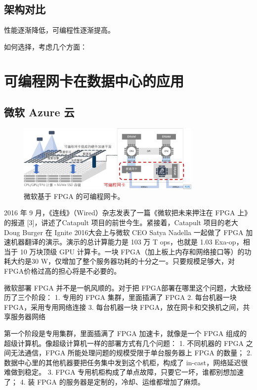 \subsection{架构对比}
\label{smartnic-comparison}

性能逐渐降低，可编程性逐渐提高。

如何选择，考虑几个方面：

\section{可编程网卡在数据中心的应用}

\subsection{微软 Azure 云}

\begin{figure}[htbp]
	\centering
	\includegraphics[width=0.8\textwidth]{figures/azure_fpga.pdf}
	\caption{微软基于 FPGA 的可编程网卡。}
	\label{background:fig:azure_fpga}
\end{figure}


2016 年 9 月，《连线》（Wired）杂志发表了一篇《微软把未来押注在 FPGA 上》的报道 [3]，讲述了Catapult 项目的前世今生。紧接着，Catapult 项目的老大 Doug Burger 在 Ignite 2016大会上与微软 CEO Satya Nadella 一起做了 FPGA 加速机器翻译的演示。演示的总计算能力是 103 万 T ops，也就是 1.03 Exa-op，相当于 10 万块顶级 GPU 计算卡。一块 FPGA（加上板上内存和网络接口等）的功耗大约是30 W，仅增加了整个服务器功耗的十分之一。只要规模足够大，对FPGA价格过高的担心将是不必要的。

微软部署 FPGA 并不是一帆风顺的。对于把 FPGA部署在哪里这个问题，大致经历了三个阶段：
1.	专用的 FPGA 集群，里面插满了 FPGA
2.	每台机器一块 FPGA，采用专用网络连接
3.	每台机器一块 FPGA，放在网卡和交换机之间，共享服务器网络

第一个阶段是专用集群，里面插满了 FPGA 加速卡，就像是一个 FPGA 组成的超级计算机。像超级计算机一样的部署方式有几个问题：
1.	不同机器的 FPGA 之间无法通信，FPGA 所能处理问题的规模受限于单台服务器上 FPGA 的数量；
2.	数据中心里的其他机器要把任务集中发到这个机柜，构成了 in-cast，网络延迟很难做到稳定。
3.	FPGA 专用机柜构成了单点故障，只要它一坏，谁都别想加速了；
4.	装 FPGA 的服务器是定制的，冷却、运维都增加了麻烦。

